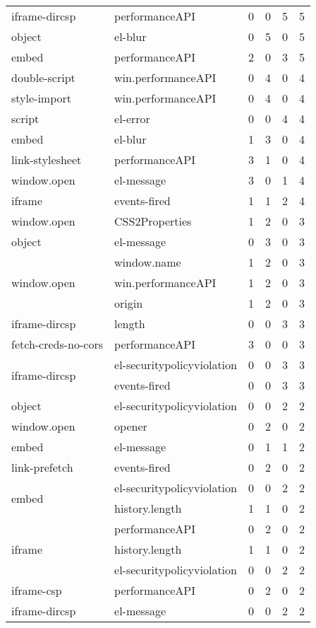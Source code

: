 \begin{tabular}{llrrrr}
iframe-dircsp & performanceAPI & 0 & 0 & 5 & 5 \\
object & el-blur & 0 & 5 & 0 & 5 \\
embed & performanceAPI & 2 & 0 & 3 & 5 \\
double-script & win.performanceAPI & 0 & 4 & 0 & 4 \\
style-import & win.performanceAPI & 0 & 4 & 0 & 4 \\
script & el-error & 0 & 0 & 4 & 4 \\
embed & el-blur & 1 & 3 & 0 & 4 \\
link-stylesheet & performanceAPI & 3 & 1 & 0 & 4 \\
window.open & el-message & 3 & 0 & 1 & 4 \\
iframe & events-fired & 1 & 1 & 2 & 4 \\
window.open & CSS2Properties & 1 & 2 & 0 & 3 \\
object & el-message & 0 & 3 & 0 & 3 \\
\multirow[c]{3}{*}{window.open} & window.name & 1 & 2 & 0 & 3 \\
 & win.performanceAPI & 1 & 2 & 0 & 3 \\
 & origin & 1 & 2 & 0 & 3 \\
iframe-dircsp & length & 0 & 0 & 3 & 3 \\
fetch-creds-no-cors & performanceAPI & 3 & 0 & 0 & 3 \\
\multirow[c]{2}{*}{iframe-dircsp} & el-securitypolicyviolation & 0 & 0 & 3 & 3 \\
 & events-fired & 0 & 0 & 3 & 3 \\
object & el-securitypolicyviolation & 0 & 0 & 2 & 2 \\
window.open & opener & 0 & 2 & 0 & 2 \\
embed & el-message & 0 & 1 & 1 & 2 \\
link-prefetch & events-fired & 0 & 2 & 0 & 2 \\
\multirow[c]{2}{*}{embed} & el-securitypolicyviolation & 0 & 0 & 2 & 2 \\
 & history.length & 1 & 1 & 0 & 2 \\
\multirow[c]{3}{*}{iframe} & performanceAPI & 0 & 2 & 0 & 2 \\
 & history.length & 1 & 1 & 0 & 2 \\
 & el-securitypolicyviolation & 0 & 0 & 2 & 2 \\
iframe-csp & performanceAPI & 0 & 2 & 0 & 2 \\
iframe-dircsp & el-message & 0 & 0 & 2 & 2 \\

\end{tabular}
